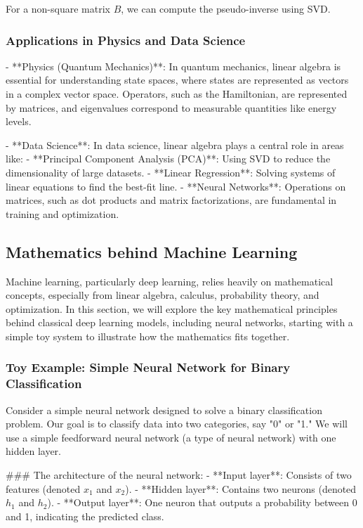 \documentclass{article}
\begin{document}
For a non-square matrix \( B \), we can compute the pseudo-inverse using SVD.

\subsubsection*{Applications in Physics and Data Science}

- **Physics (Quantum Mechanics)**: In quantum mechanics, linear algebra is essential for understanding state spaces, where states are represented as vectors in a complex vector space. Operators, such as the Hamiltonian, are represented by matrices, and eigenvalues correspond to measurable quantities like energy levels.
  
- **Data Science**: In data science, linear algebra plays a central role in areas like:
  - **Principal Component Analysis (PCA)**: Using SVD to reduce the dimensionality of large datasets.
  - **Linear Regression**: Solving systems of linear equations to find the best-fit line.
  - **Neural Networks**: Operations on matrices, such as dot products and matrix factorizations, are fundamental in training and optimization.

\subsection{Mathematics behind Machine Learning}

Machine learning, particularly deep learning, relies heavily on mathematical concepts, especially from linear algebra, calculus, probability theory, and optimization. In this section, we will explore the key mathematical principles behind classical deep learning models, including neural networks, starting with a simple toy system to illustrate how the mathematics fits together.

\subsubsection*{Toy Example: Simple Neural Network for Binary Classification}

Consider a simple neural network designed to solve a binary classification problem. Our goal is to classify data into two categories, say "0" or "1." We will use a simple feedforward neural network (a type of neural network) with one hidden layer.

### The architecture of the neural network:
- **Input layer**: Consists of two features (denoted \( x_1 \) and \( x_2 \)).
- **Hidden layer**: Contains two neurons (denoted \( h_1 \) and \( h_2 \)).
- **Output layer**: One neuron that outputs a probability between 0 and 1, indicating the predicted class.
\end{document}
